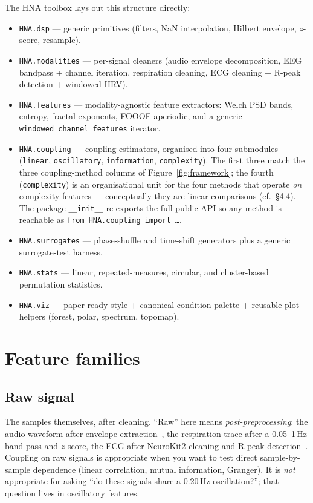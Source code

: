 \documentclass[11pt,a4paper]{article}
\begin{document}
The HNA toolbox lays out this structure directly:
\begin{itemize}
  \item \texttt{HNA.dsp} --- generic primitives (filters, NaN
        interpolation, Hilbert envelope, $z$-score, resample).
  \item \texttt{HNA.modalities} --- per-signal cleaners (audio
        envelope decomposition, EEG bandpass + channel iteration,
        respiration cleaning, ECG cleaning + R-peak detection +
        windowed HRV).
  \item \texttt{HNA.features} --- modality-agnostic feature extractors:
        Welch PSD bands, entropy, fractal exponents, FOOOF aperiodic,
        and a generic \texttt{windowed\_channel\_features} iterator.
  \item \texttt{HNA.coupling} --- coupling estimators, organised into
        four submodules (\texttt{linear}, \texttt{oscillatory},
        \texttt{information}, \texttt{complexity}). The first three
        match the three coupling-method columns of
        Figure~\ref{fig:framework}; the fourth (\texttt{complexity})
        is an organisational unit for the four methods that operate
        \emph{on} complexity features --- conceptually they are linear
        comparisons (cf.\ \S4.4). The package \texttt{\_\_init\_\_}
        re-exports the full public API so any method is reachable as
        \texttt{from HNA.coupling import \ldots}.
  \item \texttt{HNA.surrogates} --- phase-shuffle and time-shift
        generators plus a generic surrogate-test harness.
  \item \texttt{HNA.stats} --- linear, repeated-measures, circular,
        and cluster-based permutation statistics.
  \item \texttt{HNA.viz} --- paper-ready style + canonical condition
        palette + reusable plot helpers (forest, polar, spectrum,
        topomap).
\end{itemize}

\section{Feature families}

\subsection{Raw signal}

The samples themselves, after cleaning. ``Raw'' here means
\emph{post-preprocessing}: the audio waveform after envelope
extraction~\cite{NK2}, the respiration trace after a 0.05--1\,Hz
band-pass and $z$-score, the ECG after NeuroKit2 cleaning and R-peak
detection~\cite{NK2,Pichot}. Coupling on raw signals is appropriate when
you want to test direct sample-by-sample dependence (linear
correlation, mutual information, Granger). It is \emph{not} appropriate
for asking ``do these signals share a 0.20\,Hz oscillation?''; that
question lives in oscillatory features.
\end{document}

